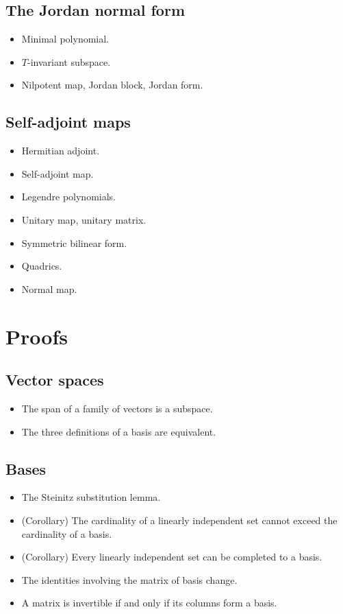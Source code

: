 \documentclass[12pt]{article}
\begin{document}
\begin{multicols}{2}
\subsection{The Jordan normal form}

\begin{itemize}
    \item Minimal polynomial.
    \item $T$-invariant subspace.
    \item Nilpotent map, Jordan block, Jordan form.
\end{itemize}


\subsection{Self-adjoint maps}

\begin{itemize}
    \item Hermitian adjoint.
    \item Self-adjoint map.
    \item Legendre polynomials.
    \item Unitary map, unitary matrix.
    \item Symmetric bilinear form.
    \item Quadrics.
    \item Normal map.
\end{itemize}



\section{Proofs}

\subsection{Vector spaces}

\begin{itemize}
    \item The span of a family of vectors is a subspace.
    \item The three definitions of a basis are equivalent.
\end{itemize}


\subsection{Bases}

\begin{itemize}
    \item The Steinitz substitution lemma.
    \item (Corollary) The cardinality of a linearly independent set
        cannot exceed the cardinality of a basis.
    \item (Corollary) Every linearly independent set can be
        completed to a basis.
    \item The identities involving the matrix of basis change.
    \item A matrix is invertible if and only if its columns form a
        basis.
\end{itemize}



\end{multicols}
\end{document}
